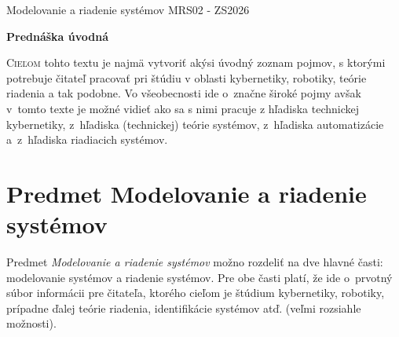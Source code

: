 \documentclass[a4paper, 10pt, ]{article}
\def\oznacenieCasti{MRS02 - ZS2026}
\begin{document}
\lstset{%
style=mystyle,
rangebeginprefix=\#\#\#\ cellB\ ,%
rangebeginsuffix=\ \#\#\#,%
rangeendprefix=\#\#\#\ cellE\ ,%
rangeendsuffix=\ \#\#\#,%
includerangemarker=false,
}





\fontsize{12pt}{22pt}\selectfont

\centerline{\textsf{Modelovanie a riadenie systémov} \hfill \textsf{\oznacenieCasti}}

\fontsize{18pt}{22pt}\selectfont





\begin{flushleft}
	\textbf{\textsf{Prednáška úvodná}}
\end{flushleft}






\normalsize

\bigskip

{\hypersetup{hidelinks}

\tableofcontents

}

\bigskip

\vspace{18pt}



\noindent
\lettrine[lines=3, nindent=0pt]{C}{ieľom} tohto textu je najmä vytvoriť akýsi úvodný zoznam pojmov, s ktorými potrebuje čitateľ pracovať pri štúdiu v oblasti kybernetiky, robotiky, teórie riadenia a tak podobne. Vo všeobecnosti ide o~značne široké pojmy avšak v~tomto texte je možné vidieť ako sa s nimi pracuje z hľadiska technickej kybernetiky, z~hľadiska (technickej) teórie systémov, z~hľadiska automatizácie a~z~hľadiska riadiacich systémov.








\section{Predmet Modelovanie a riadenie systémov}

Predmet \emph{Modelovanie a riadenie systémov} možno rozdeliť na dve hlavné časti: modelovanie systémov a riadenie systémov. Pre obe časti platí, že ide o~prvotný súbor informácii pre čitateľa, ktorého cieľom je štúdium kybernetiky, robotiky, prípadne ďalej teórie riadenia, identifikácie systémov atď. (veľmi rozsiahle možnosti).
\end{document}
